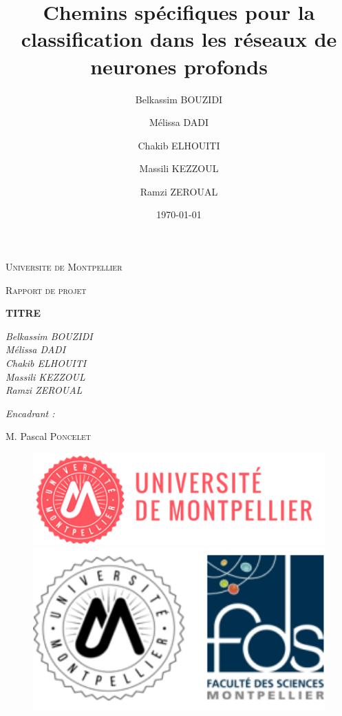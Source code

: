 \documentclass[oneside,13pt,a4paper]{report}
\title{Chemins spécifiques pour la classification dans les réseaux de neurones profonds
}
\author{
    Belkassim BOUZIDI \and
    Mélissa DADI  \and
    Chakib ELHOUITI \and
    Massili KEZZOUL \and
    Ramzi ZEROUAL
}
\date{\today}
\begin{document}
\begin{titlepage}
	\centering
	{\scshape\LARGE Universite de Montpellier\par}
	{\scshape\Large Rapport de projet\par}
	\vspace{1.5cm}
	{\huge\bfseries TITRE\par}
	\vspace{2cm}
	{\Large\itshape
		Belkassim BOUZIDI \\
    	Mélissa DADI \\
		Chakib ELHOUITI \\
		Massili KEZZOUL \\
		Ramzi ZEROUAL \\
		\par}

	\vspace{1.5cm}

	{\Large\itshape
		Encadrant :\par
		M. Pascal \textsc{Poncelet}
		\par}

	\vspace{2cm}

	\begin{figure}[h]
		\begin{minipage}[c]{.46\linewidth}
			\centering
			\includegraphics[width=1\textwidth]{img/univ-montpellier.png}
		\end{minipage}
		\hfill%
		\begin{minipage}[c]{.46\linewidth}
			\centering
			\includegraphics[width=1\textwidth]{img/fds.png}
		\end{minipage}
	\end{figure}


\end{titlepage}
\end{document}
